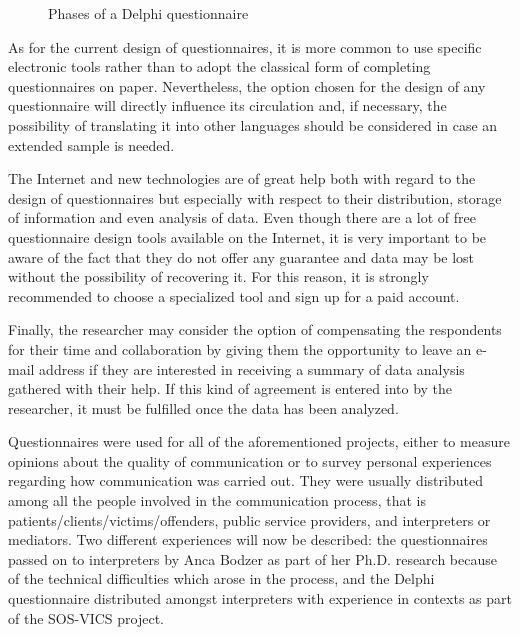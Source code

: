 \documentclass[output=paper]{LSP/langsci}
\begin{document}
\begin{figure}
{
    }
    \caption{Phases of a Delphi questionnaire}
    \label{bodzer-lazaro:fig:3}
\end{figure}

As for the current design of questionnaires, it is more common to use specific electronic tools rather than to adopt the classical form of completing questionnaires on paper. Nevertheless, the option chosen for the design of any questionnaire will directly influence its circulation and, if necessary, the possibility of translating it into other languages should be considered in case an extended sample is needed.

The Internet and new technologies are of great help both with regard to the design of questionnaires but especially with respect to their distribution, storage of information and even analysis of data. Even though there are a lot of free questionnaire design tools available on the Internet, it is very important to be aware of the fact that they do not offer any guarantee and data may be lost without the possibility of recovering it. For this reason, it is strongly recommended to choose a specialized tool and sign up for a paid account. 

Finally, the researcher may consider the option of compensating the respondents for their time and collaboration by giving them the opportunity to leave an e-mail address if they are interested in receiving a summary of data analysis gathered with their help. If this kind of agreement is entered into by the researcher, it must be fulfilled once the data has been analyzed. 

Questionnaires were used for all of the aforementioned projects, either to measure opinions about the quality of communication or to survey personal experiences regarding how communication was carried out. They were usually distributed among all the people involved in the communication process, that is patients\slash clients\slash victims\slash offenders, public service providers, and interpreters or mediators. Two different experiences will now be described: the questionnaires passed on to interpreters by Anca Bodzer as part of her Ph.D. research because of the technical difficulties which arose in the process, and the Delphi questionnaire distributed amongst interpreters with experience in  contexts as part of the SOS-VICS project. 
\end{document}
